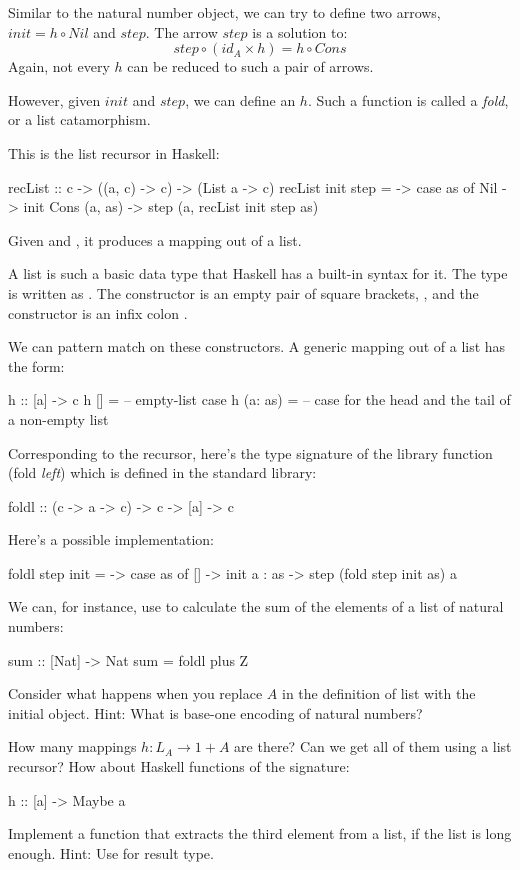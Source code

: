 \documentclass[DaoFP]{subfiles}
\begin{document}
Similar to the natural number object, we can try to define two arrows, $init = h \circ Nil$ and $step$. The arrow $step$ is a solution to:
\[ step \circ (id_A \times h) = h \circ Cons \]
Again, not every $h$ can be reduced to such a pair of arrows.

However, given $init$ and $step$, we can define an $h$. Such a function is called a \emph{fold}, or a list catamorphism. 

This is the list recursor in Haskell:
\begin{haskell}
recList :: c -> ((a, c) -> c) -> (List a -> c)
recList init step = \as ->
  case as of 
    Nil          -> init
    Cons (a, as) -> step (a, recList init step as)
\end{haskell}
Given  and , it produces a mapping out of a list.

A list is such a basic data type that Haskell has a built-in syntax for it. The type  is written as \hask{[a]}. The  constructor is an empty pair of square brackets, \hask{[]}, and the  constructor is an infix colon \hask{:}.

We can pattern match on these constructors. A generic mapping out of a list has the form:
\begin{haskell}
h :: [a] -> c
h []      = -- empty-list case
h (a: as) = -- case for the head and the tail of a non-empty list
\end{haskell}

Corresponding to the recursor, here's the type signature of the library function  (fold \emph{left}) which is defined in the standard library:
\begin{haskell}
foldl :: (c -> a -> c) -> c -> [a] -> c
\end{haskell}
Here's a possible implementation:
\begin{haskell}
foldl step init = \as ->
  case as of
    [] -> init
    a : as -> step (fold step init as) a
\end{haskell}

We can, for instance, use  to calculate the sum of the elements of a list of natural numbers:
\begin{haskell}
sum :: [Nat] -> Nat
sum = foldl plus Z
\end{haskell}


\begin{exercise}
Consider what happens when you replace $A$ in the definition of list with the initial object. Hint: What is base-one encoding of natural numbers?
\end{exercise}
\begin{exercise}
How many mappings $h \colon L_A \to 1 + A$ are there? Can we get all of them using a list recursor? How about Haskell functions of the signature:
\begin{haskell}
h :: [a] -> Maybe a
\end{haskell}
\end{exercise}
\begin{exercise}
Implement a function that extracts the third element from a list, if the list is long enough. Hint: Use  for result type.
\end{exercise}
\end{document}
